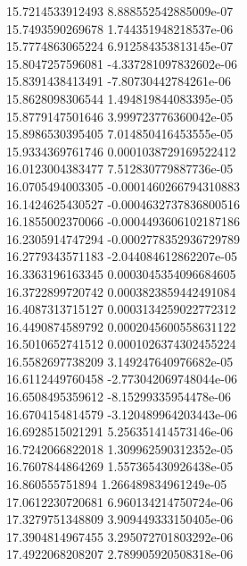 {15.7214533912493 8.888552542885009e-07 \\
15.7493590269678 1.744351948218537e-06 \\
15.7774863065224 6.912584353813145e-07 \\
15.8047257596081 -4.337281097832602e-06 \\
15.8391438413491 -7.80730442784261e-06 \\
15.8628098306544 1.494819844083395e-05 \\
15.8779147501646 3.999723776360042e-05 \\
15.8986530395405 7.014850416453555e-05 \\
15.9334369761746 0.0001038729169522412 \\
16.0123004383477 7.512830779887736e-05 \\
16.0705494003305 -0.0001460266794310883 \\
16.1424625430527 -0.0004632737836800516 \\
16.1855002370066 -0.0004493606102187186 \\
16.2305914747294 -0.0002778352936729789 \\
16.2779343571183 -2.044084612862207e-05 \\
16.3363196163345 0.0003045354096684605 \\
16.3722899720742 0.0003823859442491084 \\
16.4087313715127 0.0003134259022772312 \\
16.4490874589792 0.0002045600558631122 \\
16.5010652741512 0.0001026374302455224 \\
16.5582697738209 3.149247640976682e-05 \\
16.6112449760458 -2.773042069748044e-06 \\
16.6508495359612 -8.15299335954478e-06 \\
16.6704154814579 -3.120489964203443e-06 \\
16.6928515021291 5.256351414573146e-06 \\
16.7242066822018 1.309962590312352e-05 \\
16.7607844864269 1.557365430926438e-05 \\
16.860555751894 1.266489834961249e-05 \\
17.0612230720681 6.960134214750724e-06 \\
17.3279751348809 3.909449333150405e-06 \\
17.3904814967455 3.295072701803292e-06 \\
17.4922068208207 2.789905920508318e-06 \\
}
